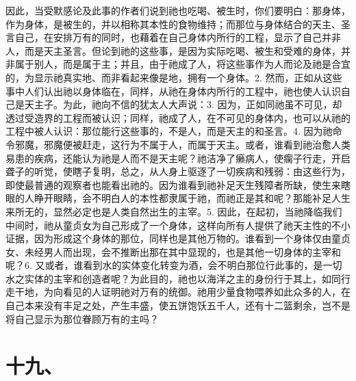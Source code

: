 因此，当受默感论及此事的作者们说到祂也吃喝、被生时，你们要明白：那身体，作为身体，是被生的，并以相称其本性的食物维持；而那位与身体结合的天主、圣言自己，在安排万有的同时，也藉着在自己身体内所行的工程，显示了自己并非人，而是天主圣言。但论到祂的这些事，是因为实际吃喝、被生和受难的身体，并非属于别人，而是属于主；并且，由于祂成了人，将这些事作为人而论及祂是合宜的，为显示祂真实地、而非看起来像是地，拥有一个身体。2. 然而，正如从这些事中人们认出祂以身体临在，同样，从祂在身体内所行的工程中，祂也使人认识自己是天主子。为此，祂向不信的犹太人大声说：3. 因为，正如同祂虽不可见，却透过受造界的工程而被认识；同样，祂成了人，在不可见的身体内，也可以从祂的工程中被人认识：那位能行这些事的，不是人，而是天主的和圣言。4. 因为祂命令邪魔，邪魔便被赶走，这行为不属于人，而属于天主。或者，谁看到祂治愈人类易患的疾病，还能认为祂是人而不是天主呢？祂洁净了癞病人，使瘸子行走，开启聋子的听觉，使瞎子复明，总之，从人身上驱逐了一切疾病和残弱：由这些行为，即使最普通的观察者也能看出祂的。因为谁看到祂补足天生残障者所缺，使生来瞎眼的人睁开眼睛，会不明白人的本性都隶属于祂，而祂正是其和呢？那能补足人生来所无的，显然必定也是人类自然出生的主宰。5. 因此，在起初，当祂降临我们中间时，祂从童贞女为自己形成了一个身体，这样向所有人提供了祂天主性的不小证据，因为形成这个身体的那位，同样也是其他万物的。谁看到一个身体仅由童贞女、未经男人而出现，会不推断出那在其中显现的，也是其他一切身体的主宰和呢？6. 又或者，谁看到水的实体变化转变为酒，会不明白那位行此事的，是一切水之实体的主宰和创造者呢？为此目的，祂也以海洋之主的身份行于其上，如同行走干地，为向看见的人证明祂对万有的统御。祂用少量食物喂养如此众多的人，在自己本来没有丰足之处，产生丰盛，使五饼饱饫五千人，还有十二篮剩余，岂不是将自己显示为那位眷顾万有的主吗？\par


\section{十九、}

